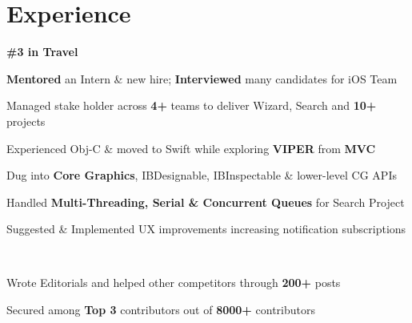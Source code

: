 \documentclass[]{Kauts}
\begin{document}
\begin{minipage}[t]{0.69\textwidth} 


\section{Experience}
 \hfill \textbf{\#3 in Travel}\\
\vspace{\topsep}
\begin{tightemize}
\item \textbf{Mentored} an Intern \& new hire; \textbf{Interviewed} many candidates for iOS Team\\
\item Managed stake holder across \textbf{4+} teams to deliver Wizard, Search and \textbf{10+} projects\\
\item Experienced Obj-C \& moved to Swift while exploring \textbf{VIPER} from \textbf{MVC}\\
\item Dug into \textbf{Core Graphics}, IBDesignable, IBInspectable \& lower-level CG APIs\\
\item Handled \textbf{Multi-Threading, Serial \& Concurrent Queues} for Search Project\\
\item Suggested \& Implemented UX improvements increasing notification subscriptions\\
\end{tightemize}
\sectionsep

\\
\begin{tightemize}
\item Wrote Editorials and helped other competitors through \textbf{200+} posts\\
\item Secured among \textbf{Top 3} contributors out of \textbf{8000+} contributors\\
\end{tightemize}
\sectionsep


\end{minipage}
\end{document}
